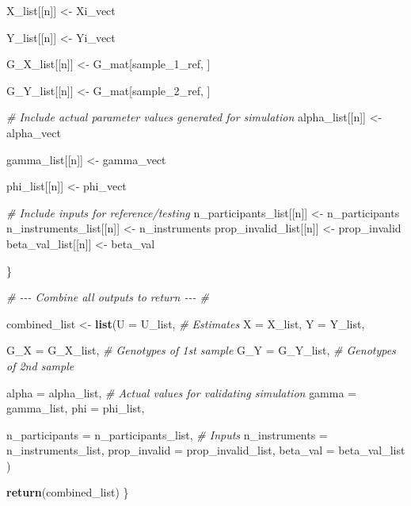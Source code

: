 \documentclass[
]{article}
\newenvironment{Shaded}{\begin{snugshade}}{\end{snugshade}}
\newcommand{\AttributeTok}[1]{\textcolor[rgb]{0.13,0.29,0.53}{#1}}
\newcommand{\CommentTok}[1]{\textcolor[rgb]{0.56,0.35,0.01}{\textit{#1}}}
\newcommand{\FunctionTok}[1]{\textcolor[rgb]{0.13,0.29,0.53}{\textbf{#1}}}
\newcommand{\NormalTok}[1]{#1}
\newcommand{\OtherTok}[1]{\textcolor[rgb]{0.56,0.35,0.01}{#1}}
\begin{document}
\begin{Shaded}
\begin{Highlighting}[]
\NormalTok{    X\_list[[n]] }\OtherTok{\textless{}{-}}\NormalTok{ Xi\_vect}
    
\NormalTok{    Y\_list[[n]] }\OtherTok{\textless{}{-}}\NormalTok{ Yi\_vect}
    
\NormalTok{    G\_X\_list[[n]] }\OtherTok{\textless{}{-}}\NormalTok{ G\_mat[sample\_1\_ref, ]}
    
\NormalTok{    G\_Y\_list[[n]] }\OtherTok{\textless{}{-}}\NormalTok{ G\_mat[sample\_2\_ref, ]}
    
    
    \CommentTok{\# Include actual parameter values generated for simulation }
\NormalTok{    alpha\_list[[n]] }\OtherTok{\textless{}{-}}\NormalTok{ alpha\_vect}
    
\NormalTok{    gamma\_list[[n]] }\OtherTok{\textless{}{-}}\NormalTok{ gamma\_vect}
    
\NormalTok{    phi\_list[[n]] }\OtherTok{\textless{}{-}}\NormalTok{ phi\_vect}
    
    \CommentTok{\# Include inputs for reference/testing }
\NormalTok{    n\_participants\_list[[n]] }\OtherTok{\textless{}{-}}\NormalTok{ n\_participants}
\NormalTok{    n\_instruments\_list[[n]] }\OtherTok{\textless{}{-}}\NormalTok{ n\_instruments}
\NormalTok{    prop\_invalid\_list[[n]] }\OtherTok{\textless{}{-}}\NormalTok{ prop\_invalid}
\NormalTok{    beta\_val\_list[[n]] }\OtherTok{\textless{}{-}}\NormalTok{ beta\_val}
    
    
\NormalTok{  \}}
  
  
  
  \CommentTok{\# {-}{-}{-} Combine all outputs to return {-}{-}{-} \#}
  
\NormalTok{  combined\_list }\OtherTok{\textless{}{-}} \FunctionTok{list}\NormalTok{(}\AttributeTok{U =}\NormalTok{ U\_list,         }\CommentTok{\# Estimates }
                        \AttributeTok{X =}\NormalTok{ X\_list, }
                        \AttributeTok{Y =}\NormalTok{ Y\_list,}
                        
                        \AttributeTok{G\_X =}\NormalTok{ G\_X\_list,     }\CommentTok{\# Genotypes of 1st sample}
                        \AttributeTok{G\_Y =}\NormalTok{ G\_Y\_list,     }\CommentTok{\# Genotypes of 2nd sample}
                        
                        \AttributeTok{alpha =}\NormalTok{ alpha\_list, }\CommentTok{\# Actual values for validating simulation}
                        \AttributeTok{gamma =}\NormalTok{ gamma\_list,}
                        \AttributeTok{phi =}\NormalTok{ phi\_list,}
                        
                        \AttributeTok{n\_participants =}\NormalTok{ n\_participants\_list, }\CommentTok{\# Inputs}
                        \AttributeTok{n\_instruments =}\NormalTok{ n\_instruments\_list,}
                        \AttributeTok{prop\_invalid =}\NormalTok{ prop\_invalid\_list,}
                        \AttributeTok{beta\_val =}\NormalTok{ beta\_val\_list}
\NormalTok{  )}
  
  \FunctionTok{return}\NormalTok{(combined\_list)}
\NormalTok{\}}
\end{Highlighting}
\end{Shaded}
\end{document}
